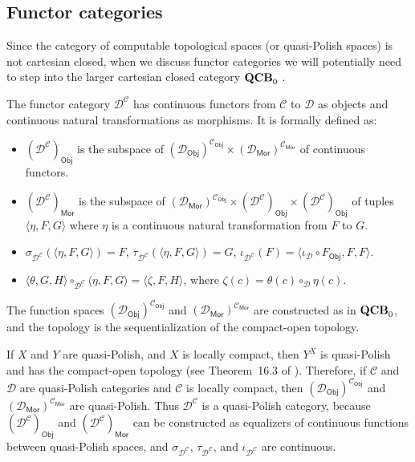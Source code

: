 \documentclass[envcountsame]{llncs}
\def\QCB{{{\bf QCB}_0}}
\def\calC{{\mathcal{C}}}
\def\calD{{\mathcal{D}}}
\def\QCB{{{\bf QCB}_0}}
\newcommand{\Mor}{\mathsf{Mor}}
\newcommand{\Obj}{\mathsf{Obj}}
\def\src{{\sigma}}
\def\tar{{\tau}}
\def\id{{\iota}}
\begin{document}
\subsection{Functor categories}

Since the category of computable topological spaces (or quasi-Polish spaces) is not cartesian closed, when we discuss functor categories we will potentially need to step into the larger cartesian closed category $\QCB$ \cite{Sch21}. 

The functor category $\calD^\calC$ has continuous functors from $\calC$ to $\calD$ as objects and continuous natural transformations as morphisms. It is formally defined as:
\begin{itemize}
\item
$(\calD^\calC)_\Obj$ is the subspace of $(\calD_\Obj)^{\calC_\Obj}\times (\calD_\Mor)^{\calC_\Mor}$ of continuous functors.
\item
$(\calD^\calC)_\Mor$ is the subspace of $(\calD_\Mor)^{\calC_\Obj} \times (\calD^\calC)_\Obj\times (\calD^\calC)_\Obj$ of tuples $\langle \eta, F,G\rangle$ where $\eta$ is a continuous natural transformation from $F$ to $G$.
\item
$\src_{\calD^\calC}(\langle \eta, F,G\rangle) = F$, $\tar_{\calD^\calC}(\langle \eta, F,G\rangle)=G$, $\id_{\calD^\calC}(F) =\langle \id_\calD\circ F_{\Obj}, F,F\rangle$.
\item
$\langle \theta, G,H\rangle \circ_{\calD^\calC} \langle \eta, F,G\rangle = \langle \zeta, F,H\rangle$, where $\zeta(c) = \theta(c) \circ_{\calD} \eta(c)$.
\end{itemize} 

The function spaces $(\calD_\Obj)^{\calC_\Obj}$ and $(\calD_\Mor)^{\calC_\Mor}$ are constructed as in $\QCB$, and the topology is the sequentialization of the compact-open topology. 

If $X$ and $Y$ are quasi-Polish, and $X$ is locally compact, then $Y^X$ is quasi-Polish and has the compact-open topology (see Theorem~16.3 of \cite{DGJL}). Therefore, if $\calC$ and $\calD$ are quasi-Polish categories and $\calC$ is locally compact, then $(\calD_\Obj)^{\calC_\Obj}$ and $(\calD_\Mor)^{\calC_\Mor}$ are quasi-Polish. Thus $\calD^\calC$ is a quasi-Polish category, because $(\calD^\calC)_\Obj$ and $(\calD^\calC)_\Mor$ can be constructed as equalizers of continuous functions between quasi-Polish spaces, and $\src_{\calD^\calC}$, $\tar_{\calD^\calC}$, and $\id_{\calD^\calC}$ are continuous.
\end{document}
